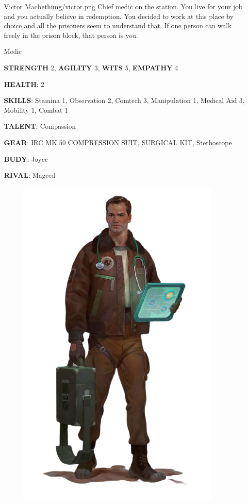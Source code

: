 \clearpage


\begin{rpg-pcbox}{Victor Macbeth}{img/victor.png}
    Chief medic on the station. You live for your job and you actually believe in redemption. You decided to work at this place by choice and all the prisoners seem to understand that. If one person can walk freely in the prison block, that person is you.
\end{rpg-pcbox}

\begin{rpg-commentbox}{}
    Medic

    \textbf{STRENGTH} 2, \textbf{AGILITY} 3, \textbf{WITS} 5, \textbf{EMPATHY} 4

    \textbf{HEALTH}: 2

    \textbf{SKILLS}: Stamina 1, Observation 2, Comtech 3, Manipulation 1, Medical Aid 3, Mobility 1, Combat 1
    
    \textbf{TALENT}: Compassion
    
    \textbf{GEAR}: IRC MK.50 COMPRESSION SUIT, SURGICAL KIT, Stethoscope

    
    \textbf{BUDY}: Joyce
    
    \textbf{RIVAL}: Mageed
\end{rpg-commentbox}



\begin{figure}
    \hspace*{-1in}
    \includegraphics[width=.55\textwidth]{img/bg/medic.png}
    \label{fig:refinery}
\end{figure}
